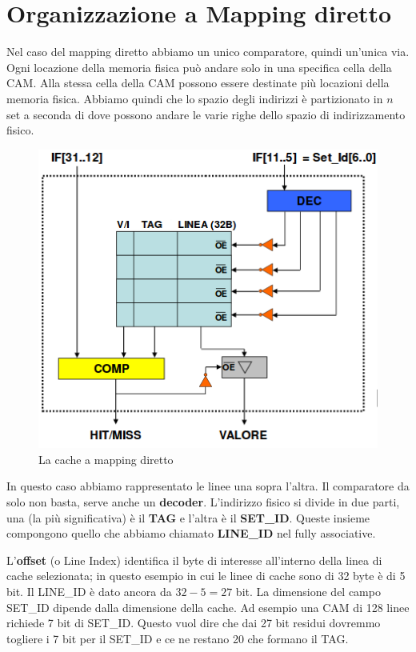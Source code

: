 \documentclass[11pt]{book}
\begin{document}
\section{Organizzazione a Mapping diretto}

Nel caso del mapping diretto abbiamo un unico comparatore, quindi
un'unica via. Ogni locazione della memoria fisica pu\`o andare solo in
una specifica cella della CAM. Alla stessa cella della CAM possono
essere destinate pi\`u locazioni della memoria fisica. Abbiamo quindi
che lo spazio degli indirizzi \`e partizionato in $n$ set a seconda di
dove possono andare le varie righe dello spazio di indirizzamento
fisico.  

\begin{figure}[h]
  \centering
  \includegraphics[width=.4\textwidth]{images/mappingdiretto.png}
  \caption{La cache a mapping diretto}
  \label{mappingdiretto}
\end{figure}

In questo caso abbiamo rappresentato le linee una sopra l'altra. Il
comparatore da solo non basta, serve anche un {\bf
  decoder}. L'indirizzo fisico si divide in due parti, una (la pi\`u
significativa) \`e il {\bf TAG} e l'altra \`e il {\bf SET\_ID}. Queste
insieme compongono quello che abbiamo chiamato {\bf LINE\_ID} nel
fully associative.

\par\bigskip

L'{\bf offset} (o Line Index) identifica il byte di interesse
all'interno della linea di cache selezionata; in questo esempio in cui
le linee di cache sono di 32 byte \`e di 5 bit. Il LINE\_ID \`e dato
ancora da $32-5=27$ bit. La dimensione del campo SET\_ID dipende dalla
dimensione della cache. Ad esempio una CAM di 128 linee richiede 7 bit
di SET\_ID. Questo vuol dire che dai 27 bit residui dovremmo togliere
i 7 bit per il SET\_ID e ce ne restano 20 che formano il TAG.

\par\bigskip
\end{document}
